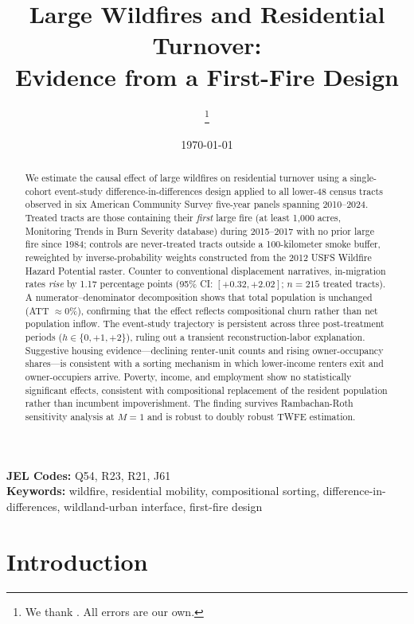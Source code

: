 \documentclass[12pt]{article}
\title{Large Wildfires and Residential Turnover:\\
       Evidence from a First-Fire Design}
\author{\ph{Author Name(s)}\thanks{%
  \ph{Affiliation. Email: author@institution.edu.}
  We thank \ph{[acknowledgments]}. All errors are our own.}}
\date{\today}
\begin{document}
\maketitle

\begin{abstract}
\noindent
We estimate the causal effect of large wildfires on residential turnover
using a single-cohort event-study difference-in-differences design
applied to all lower-48 census tracts observed in six American Community
Survey five-year panels spanning 2010--2024.
Treated tracts are those containing their \emph{first} large fire
(at least 1,000 acres, Monitoring Trends in Burn Severity database)
during 2015--2017 with no prior large fire since 1984;
controls are never-treated tracts outside a 100-kilometer smoke buffer,
reweighted by inverse-probability weights constructed from the
2012 USFS Wildfire Hazard Potential raster.
Counter to conventional displacement narratives,
in-migration rates \emph{rise} by 1.17 percentage points
(95\% CI: $[+0.32, +2.02]$; $n = 215$ treated tracts).
A numerator--denominator decomposition shows that total population
is unchanged (ATT $\approx 0$\%), confirming that the effect reflects
compositional churn rather than net population inflow.
The event-study trajectory is persistent across three post-treatment
periods ($h \in \{0, +1, +2\}$), ruling out a transient
reconstruction-labor explanation.
Suggestive housing evidence---declining renter-unit counts and
rising owner-occupancy shares---is consistent with a sorting mechanism
in which lower-income renters exit and owner-occupiers arrive.
Poverty, income, and employment show no statistically significant effects,
consistent with compositional replacement of the resident population
rather than incumbent impoverishment.
The finding survives Rambachan-Roth sensitivity analysis
at $M = 1$ and is robust to doubly robust TWFE estimation.
\end{abstract}

\textbf{JEL Codes:} Q54, R23, R21, J61 \\
\textbf{Keywords:} wildfire, residential mobility, compositional sorting,
                    difference-in-differences, wildland-urban interface,
                    first-fire design

\clearpage

\section{Introduction}
\label{sec:intro}
\end{document}
